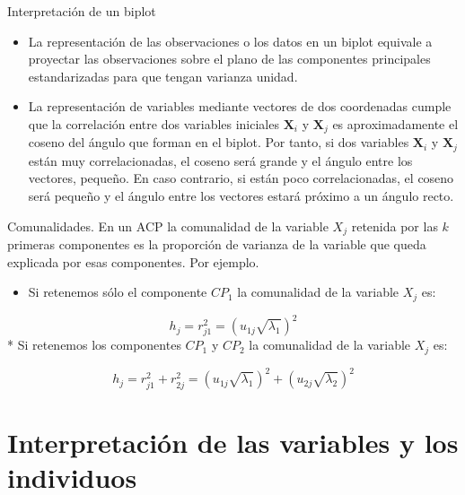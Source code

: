 \documentclass[
  spanish,
  ignorenonframetext,
]{beamer}
\providecommand{\tightlist}{%
  \setlength{\itemsep}{0pt}\setlength{\parskip}{0pt}}
\begin{document}
\begin{frame}{Interpretación de un biplot}
\protect\hypertarget{interpretaciuxf3n-de-un-biplot}{}
\begin{itemize}
\tightlist
\item
  La representación de las observaciones o los datos en un biplot
  equivale a proyectar las observaciones sobre el plano de las
  componentes principales estandarizadas para que tengan varianza
  unidad.
\item
  La representación de variables mediante vectores de dos coordenadas
  cumple que la correlación entre dos variables iniciales
  \(\mathbf{X}_i\) y \(\mathbf{X}_j\) es aproximadamente el coseno del
  ángulo que forman en el biplot. Por tanto, si dos variables
  \(\mathbf{X}_i\) y \(\mathbf{X}_j\) están muy correlacionadas, el
  coseno será grande y el ángulo entre los vectores, pequeño. En caso
  contrario, si están poco correlacionadas, el coseno será pequeño y el
  ángulo entre los vectores estará próximo a un ángulo recto.
\end{itemize}
\end{frame}

\begin{frame}{Comunalidades.}
\protect\hypertarget{comunalidades.}{}
En un ACP la comunalidad de la variable \(X_j\) retenida por las \(k\)
primeras componentes es la proporción de varianza de la variable que
queda explicada por esas componentes. Por ejemplo.

\begin{itemize}
\tightlist
\item
  Si retenemos sólo el componente \(CP_1\) la comunalidad de la variable
  \(X_j\) es:
\end{itemize}

\[h_j=r_{j 1}^2=\left( u_{1 j}\sqrt{\lambda_1}\right)^2\] * Si retenemos
los componentes \(CP_1\) y \(CP_2\) la comunalidad de la variable
\(X_j\) es:

\[h_j=r_{j 1}^2+r_{2 j}^2=\left( u_{1 j}\sqrt{\lambda_1}\right)^2+
 \left( u_{2 j}\sqrt{\lambda_2}\right)^2\]
\end{frame}

\hypertarget{interpretaciuxf3n-de-las-variables-y-los-individuos}{%
\section{Interpretación de las variables y los
individuos}\label{interpretaciuxf3n-de-las-variables-y-los-individuos}}
\end{document}
